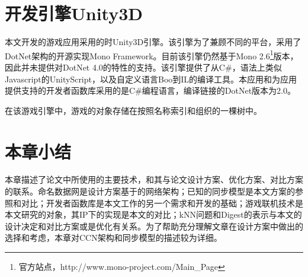 \section{开发引擎Unity3D}
\par
本文开发的游戏应用采用的时Unity3D引擎。该引擎为了兼顾不同的平台，采用了DotNet架构的开源实现Mono Framework。目前该引擎仍然基于Mono 2.6\footnote{官方站点，http://www.mono-project.com/Main\_Page}版本，因此并未提供对DotNet 4.0的特性的支持。该引擎提供了从C\#，语法上类似Javascript的UnityScript，以及自定义语言Boo到IL的编译工具。本应用和为应用提供支持的开发者函数库采用的是C\#编程语言，编译链接的DotNet版本为2.0。
\par
在该游戏引擎中，游戏的对象存储在按照名称索引和组织的一棵树中。
\section{本章小结}
\par
本章描述了论文中所使用的主要技术，和其与论文设计方案、优化方案、对比方案的联系。命名数据网是设计方案基于的网络架构；已知的同步模型是本文方案的参照和对比；开发者函数库是本文工作的另一个需求和开发的基础；游戏联机技术是本文研究的对象，其IP下的实现是本文的对比；kNN问题和Digest的表示与本文的设计决定和对比方案或是优化有关系。为了帮助充分理解文章在设计方案中做出的选择和考虑，本章对CCN架构和同步模型的描述较为详细。